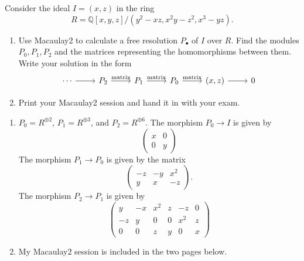 \documentclass[12 pt, letterpaper]{hmcpset}
\begin{document}
\begin{problem}[1.]
	Consider the ideal $I = (x, z)$ in the ring
	\[
		R = \mathbb{Q}[x, y, z] / (y^{2} - xz, x^{2} y - z^{2}, x^{3} - yz).
	\]
	\begin{enumerate}
		\item Use Macaulay2 to calculate a free resolution $P_{\bullet}$ of $I$ over $R$. Find the modules $P_{0}, P_{1}, P_{2}$ and the matrices representing the homomorphisms between them. Write your solution in the form
			\[
				\begin{tikzcd}
					\cdots \ar[r] & P_{2} \ar[r, "\text{matrix}"] & P_{1} \ar[r, "\text{matrix}"] & P_{0} \ar[r, "\text{matrix}"] & (x, z) \ar[r] & 0
				\end{tikzcd}
			\]

		\item Print your Macaulay2 session and hand it in with your exam.
	\end{enumerate}
\end{problem}

\begin{solution}
	\begin{enumerate}
		\item $P_{0} = R^{\oplus 2}$, $P_{1} = R^{\oplus 3}$, and $P_{2} = R^{\oplus 6}$. The morphism $P_{0} \to I$ is given by
			\[
				\begin{pmatrix}
					x & 0 \\
					0 & y
				\end{pmatrix}
			\]
			The morphism $P_{1} \to P_{0}$ is given by the matrix
			\[
				\begin{pmatrix}
					-z & - y & x^{2} \\
					y & x & -z
				\end{pmatrix}.
			\]
			The morphism $P_{2} \to P_{1}$ is given by
			\[
				\begin{pmatrix}
					y & -x & x^{2} & z & -z & 0 \\
					-z & y & 0 & 0 & x^{2} & z \\
					0 & 0 & z & y & 0 & x
				\end{pmatrix}
			\]

		\item My Macaulay2 session is included in the two pages below.
	\end{enumerate}
\end{solution}



\pagebreak
\end{document}
